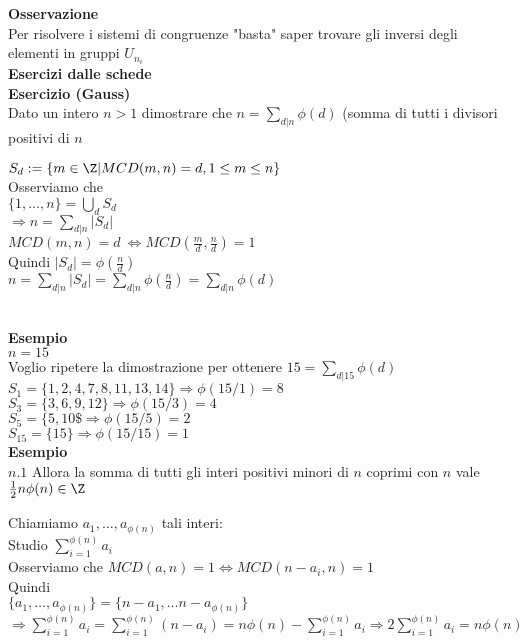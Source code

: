 \documentclass[12px]{article}
\begin{document}
	\textbf{Osservazione}\\
	Per risolvere i sistemi di congruenze "basta" saper trovare gli inversi degli elementi in gruppi $U_{n_i}$\\
	 \textbf{Esercizi dalle schede}\\
	 \textbf{Esercizio (Gauss)}\\
	 Dato un intero $n > 1$ dimostrare che  $n = \sum_{d | n} \phi (d)$ (somma di tutti i divisori positivi di $n$
\begin{dimo}
	$S_d : = \{m\in \Z | MCD(m,n) = d, 1 \leq m\leq n\}$\\
	Osserviamo che \\
	$\{1,\ldots,n\} = \bigcup_dS_d$\\
	 $ \Rightarrow  n= \sum_{d | n} | S_d|$\\
 $MCD(m,n) = d \ \Leftrightarrow MCD(\frac md, \frac nd) = 1$\\
 Quindi $|S_d| = \phi(\frac nd)$\\
 $n = \sum_{d|n}|S_d| = \sum_{d|n}\phi(\frac nd) = \sum_{d|n}\phi(d)$\\
\end{dimo}
 \newpage \\ 
 \textbf{Esempio}\\
 $n = 15$\\
 Voglio ripetere la dimostrazione per ottenere  $15 = \sum_{d|15}\phi(d)$\\
 $S_1 = \{1,2, 4, 7, 8, 11, 13 , 14\} \Rightarrow \phi(15/1) = 8$\\
 $S_3 = \{3, 6, 9, 12\} \Rightarrow \phi(15/3) = 4$\\
 $S_5 = \{5, 10\$ \Rightarrow \phi(15/5) = 2$\\
	 $S_{15} = \{15\} \Rightarrow \phi ( 15/15) = 1$\\
\textbf{Esempio}\\
$n.1$ Allora la somma di tutti gli interi positivi minori di $n$ coprimi con $n$ vale $\frac 12n\phi(n)\in \Z$
\begin{dimo}
	Chiamiamo $a_1,\ldots, a_{\phi(n)}$ tali interi:\\
	Studio $\sum_{i=1}^{\phi(n)}a_i$\\
	Osserviamo che  $MCD(a,n)=1 \Leftrightarrow MCD(n-a_i, n) = 1$ \\
	Quindi\\
	$\{a_1,\ldots, a_{\phi(n)}\} = \{n - a_1,\ldots n - a_{\phi(n)}\}$\\
	$ \Rightarrow \sum^{\phi(n)}_{i=1}a_i = \sum^{\phi(n)}_{i=1}(n-a_i) = n\phi(n) - \sum^{\phi(n)}_{i=1}a_i \Rightarrow 2 \sum^{\phi(n)}_{i=1}a_i = n \phi(n)$
\end{dimo}
\end{document}
